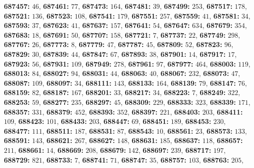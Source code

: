 \textsf{\bfseries 687457:} $46$, \textsf{\bfseries 687461:} $77$, \textsf{\bfseries 687473:} $164$, \textsf{\bfseries 687481:} $39$, \textsf{\bfseries 687499:} $253$, \textsf{\bfseries 687517:} $178$, \textsf{\bfseries 687521:} $136$, \textsf{\bfseries 687523:} $108$, \textsf{\bfseries 687541:} $179$, \textsf{\bfseries 687551:} $257$, \textsf{\bfseries 687559:} $41$, \textsf{\bfseries 687581:} $34$, \textsf{\bfseries 687593:} $37$, \textsf{\bfseries 687623:} $41$, \textsf{\bfseries 687637:} $157$, \textsf{\bfseries 687641:} $54$, \textsf{\bfseries 687647:} $634$, \textsf{\bfseries 687679:} $354$, \textsf{\bfseries 687683:} $18$, \textsf{\bfseries 687691:} $50$, \textsf{\bfseries 687707:} $158$, \textsf{\bfseries 687721:} $7$, \textsf{\bfseries 687737:} $22$, \textsf{\bfseries 687749:} $298$, \textsf{\bfseries 687767:} $26$, \textsf{\bfseries 687773:} $8$, \textsf{\bfseries 687779:} $47$, \textsf{\bfseries 687787:} $45$, \textsf{\bfseries 687809:} $52$, \textsf{\bfseries 687823:} $96$, \textsf{\bfseries 687829:} $30$, \textsf{\bfseries 687839:} $44$, \textsf{\bfseries 687847:} $67$, \textsf{\bfseries 687893:} $38$, \textsf{\bfseries 687901:} $14$, \textsf{\bfseries 687917:} $17$, \textsf{\bfseries 687923:} $56$, \textsf{\bfseries 687931:} $109$, \textsf{\bfseries 687949:} $278$, \textsf{\bfseries 687961:} $97$, \textsf{\bfseries 687977:} $464$, \textsf{\bfseries 688003:} $119$, \textsf{\bfseries 688013:} $84$, \textsf{\bfseries 688027:} $94$, \textsf{\bfseries 688031:} $44$, \textsf{\bfseries 688063:} $40$, \textsf{\bfseries 688067:} $232$, \textsf{\bfseries 688073:} $47$, \textsf{\bfseries 688087:} $109$, \textsf{\bfseries 688097:} $34$, \textsf{\bfseries 688111:} $143$, \textsf{\bfseries 688133:} $164$, \textsf{\bfseries 688139:} $79$, \textsf{\bfseries 688147:} $76$, \textsf{\bfseries 688159:} $82$, \textsf{\bfseries 688187:} $167$, \textsf{\bfseries 688201:} $33$, \textsf{\bfseries 688217:} $34$, \textsf{\bfseries 688223:} $7$, \textsf{\bfseries 688249:} $322$, \textsf{\bfseries 688253:} $59$, \textsf{\bfseries 688277:} $235$, \textsf{\bfseries 688297:} $45$, \textsf{\bfseries 688309:} $229$, \textsf{\bfseries 688333:} $323$, \textsf{\bfseries 688339:} $171$, \textsf{\bfseries 688357:} $331$, \textsf{\bfseries 688379:} $452$, \textsf{\bfseries 688393:} $352$, \textsf{\bfseries 688397:} $221$, \textsf{\bfseries 688403:} $203$, \textsf{\bfseries 688411:} $109$, \textsf{\bfseries 688423:} $101$, \textsf{\bfseries 688433:} $203$, \textsf{\bfseries 688447:} $69$, \textsf{\bfseries 688451:} $189$, \textsf{\bfseries 688453:} $230$, \textsf{\bfseries 688477:} $111$, \textsf{\bfseries 688511:} $187$, \textsf{\bfseries 688531:} $87$, \textsf{\bfseries 688543:} $10$, \textsf{\bfseries 688561:} $23$, \textsf{\bfseries 688573:} $133$, \textsf{\bfseries 688591:} $143$, \textsf{\bfseries 688621:} $267$, \textsf{\bfseries 688627:} $148$, \textsf{\bfseries 688631:} $185$, \textsf{\bfseries 688637:} $118$, \textsf{\bfseries 688657:} $211$, \textsf{\bfseries 688661:} $14$, \textsf{\bfseries 688669:} $208$, \textsf{\bfseries 688679:} $142$, \textsf{\bfseries 688697:} $239$, \textsf{\bfseries 688717:} $197$, \textsf{\bfseries 688729:} $821$, \textsf{\bfseries 688733:} $7$, \textsf{\bfseries 688741:} $71$, \textsf{\bfseries 688747:} $35$, \textsf{\bfseries 688757:} $103$, \textsf{\bfseries 688763:} $205$, 
